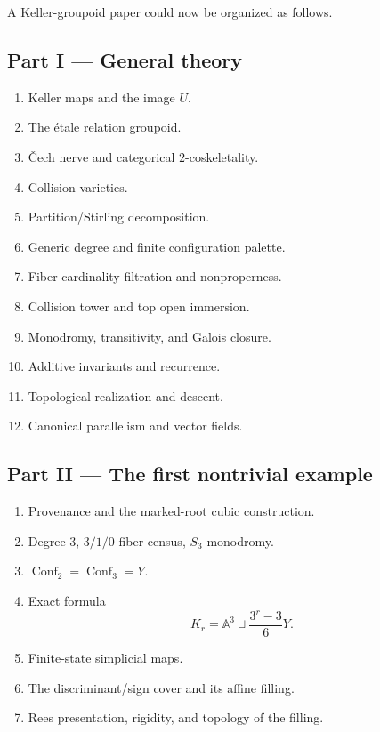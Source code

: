 A Keller-groupoid paper could now be organized as follows.

\subsection{Part I --- General theory}\label{part-i-general-theory}

\begin{enumerate}
\def\labelenumi{\arabic{enumi}.}
\tightlist
\item
  Keller maps and the image \(U\).
\item
  The étale relation groupoid.
\item
  Čech nerve and categorical \(2\)-coskeletality.
\item
  Collision varieties.
\item
  Partition/Stirling decomposition.
\item
  Generic degree and finite configuration palette.
\item
  Fiber-cardinality filtration and nonproperness.
\item
  Collision tower and top open immersion.
\item
  Monodromy, transitivity, and Galois closure.
\item
  Additive invariants and recurrence.
\item
  Topological realization and descent.
\item
  Canonical parallelism and vector fields.
\end{enumerate}

\subsection{Part II --- The first nontrivial
example}\label{part-ii-the-first-nontrivial-example}

\begin{enumerate}
\def\labelenumi{\arabic{enumi}.}
\setcounter{enumi}{12}
\tightlist
\item
  Provenance and the marked-root cubic construction.
\item
  Degree \(3\), \(3/1/0\) fiber census, \(S_3\) monodromy.
\item
  \(\operatorname{Conf}_2=\operatorname{Conf}_3=Y\).
\item
  Exact formula \[
  K_r=\mathbb A^3\sqcup\frac{3^r-3}{6}Y.
  \]
\item
  Finite-state simplicial maps.
\item
  The discriminant/sign cover and its affine filling.
\item
  Rees presentation, rigidity, and topology of the filling.
\end{enumerate}

